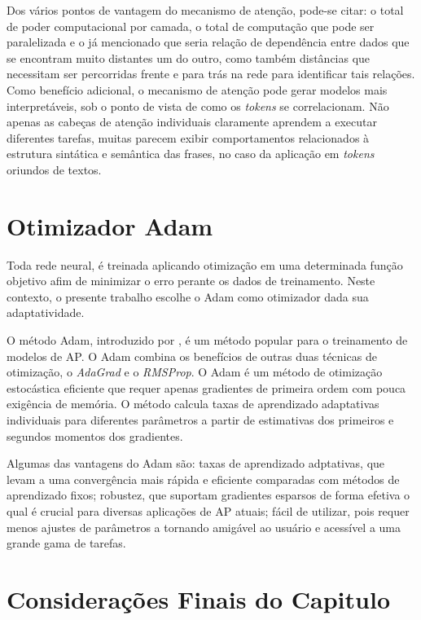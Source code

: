 Dos vários pontos de vantagem do mecanismo de atenção, pode-se citar: o total de poder computacional por camada, o total de computação que pode ser paralelizada e o já mencionado que seria relação de dependência entre dados que se encontram muito distantes um do outro, como também distâncias que necessitam ser percorridas frente e para trás na rede para identificar tais relações. Como benefício adicional, o mecanismo de atenção pode gerar modelos mais interpretáveis, sob o ponto de vista de como os \textit{tokens} se correlacionam. Não apenas as cabeças de atenção individuais claramente aprendem a executar diferentes tarefas, muitas parecem exibir comportamentos relacionados à estrutura sintática e semântica das frases, no caso da aplicação em \textit{tokens} oriundos de textos.

\section{Otimizador Adam}
\label{subsec:otimizadores_cap_3}

Toda rede neural, é treinada aplicando otimização em uma determinada função objetivo afim de minimizar o erro perante os dados de treinamento. Neste contexto, o presente trabalho escolhe o \gls{Adam} como otimizador dada sua adaptatividade.

O método \gls{Adam}, introduzido por , é um método popular para o treinamento de modelos de \gls{AP}. O \gls{Adam} combina os benefícios de outras duas técnicas de otimização, o \textit{AdaGrad} e o \textit{RMSProp}. O \gls{Adam} é um método de otimização estocástica eficiente que requer apenas gradientes de primeira ordem com pouca exigência de memória. O método calcula taxas de aprendizado adaptativas individuais para diferentes parâmetros a partir de estimativas dos primeiros e segundos momentos dos gradientes.

Algumas das vantagens do \gls{Adam} são: taxas de aprendizado adptativas, que levam a uma convergência mais rápida e eficiente comparadas com métodos de aprendizado fixos; robustez, que suportam gradientes esparsos de forma efetiva o qual é crucial para diversas aplicações de \gls{AP} atuais; fácil de utilizar, pois requer menos ajustes de parâmetros a tornando amigável ao usuário e acessível a uma grande gama de tarefas.


\section{Considerações Finais do Capitulo}
\label{subsec:rcond_cap_3}


